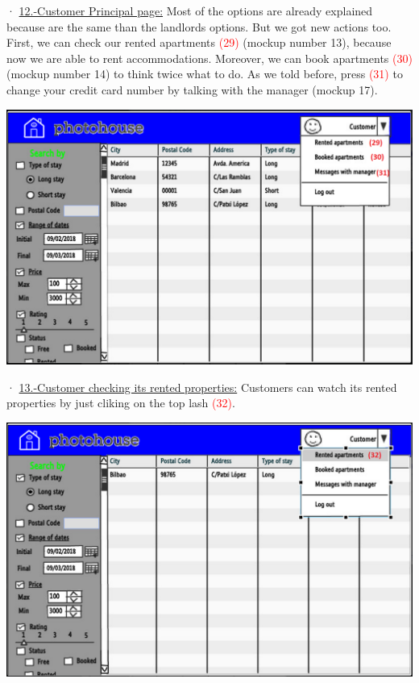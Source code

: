 \documentclass[12pt]{article}
\begin{document}
{· \underline{12.-Customer Principal page:} Most of the options are already explained because are the same than the landlords options. But we got new actions too. First, we can check our rented apartments \textcolor{red}{(29)} (mockup number 13), because now we are able to rent accommodations. Moreover, we can book apartments \textcolor{red}{(30)} (mockup number 14) to think twice what to do. As we told before, press \textcolor{red}{(31)} to change your credit card number by talking with the manager (mockup 17).
\begin{center}
	\includegraphics[scale=.7]{customer.PNG}
\end{center}


· \underline{13.-Customer checking its rented properties:} Customers can watch its rented properties by just cliking on the top lash \textcolor{red}{(32)}.
\begin{center}
	\includegraphics[scale=.7]{customer_rented.PNG}
\end{center}

}
\end{document}
